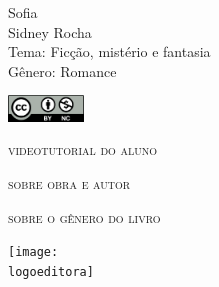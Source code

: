 \documentclass{article}
\begin{document}
										\begin{frame}\begin{raggedleft}
										\Huge 
Sofia									\\
										\huge 
Sidney Rocha							\\
										\bigskip
										\normalsize
Tema: Ficção, mistério e fantasia		\\	
Gênero: Romance							\\\vfill\hfill

\publishername

										\end{raggedleft}

\smallskip\includegraphics[width=2cm]{ccbync.png}\hfill
\end{frame}


\begin{frame}{\textsc{videotutorial do aluno}}
\vspace{-2cm}\begin{figure}
\hfill{}
\end{figure}
\end{frame}


\begin{frame}
\hfill\Huge
\textsc{sobre obra e autor}
\end{frame}

\begin{frame}
\hfill\Huge
\textsc{sobre o gênero do livro}
\end{frame}




\begin{frame}
\centering\hfill\texttt{[image: \\logoeditora]}
\end{frame}
\end{document}
